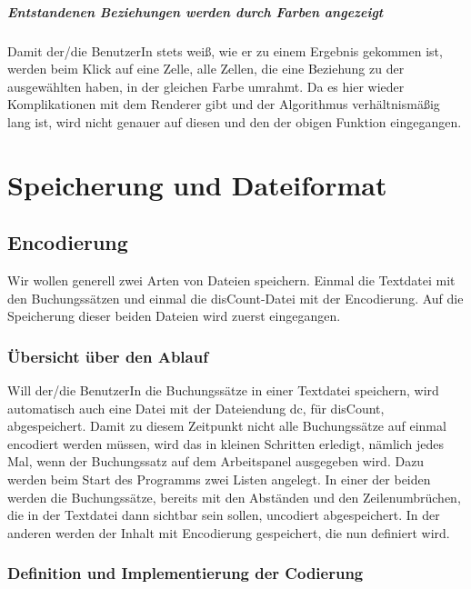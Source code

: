 \documentclass[12pt]{report}
\begin{document}
\subsubsection{Entstandenen Beziehungen werden durch Farben angezeigt}
Damit der/die BenutzerIn stets weiß, wie er zu einem Ergebnis gekommen ist, werden beim Klick auf eine Zelle, alle Zellen, die eine Beziehung zu der ausgewählten haben, in der gleichen Farbe umrahmt. Da es hier wieder Komplikationen mit dem Renderer gibt und der Algorithmus verhältnismäßig lang ist, wird nicht genauer auf diesen und den der obigen Funktion eingegangen.





\part{Speicherung und Dateiformat}

\chapter{Encodierung}
Wir wollen generell zwei Arten von Dateien speichern. Einmal die Textdatei mit den Buchungssätzen und einmal die disCount-Datei mit der Encodierung. Auf die Speicherung dieser beiden Dateien wird zuerst eingegangen.


\section{Übersicht über den Ablauf}
Will der/die BenutzerIn die Buchungssätze in einer Textdatei speichern, wird automatisch auch eine Datei mit der Dateiendung dc, für disCount, abgespeichert. Damit zu diesem Zeitpunkt nicht alle Buchungssätze auf einmal encodiert werden müssen, wird das in kleinen Schritten erledigt, nämlich jedes Mal, wenn der Buchungssatz auf dem Arbeitspanel ausgegeben wird. Dazu werden beim Start des Programms zwei Listen angelegt. In einer der beiden werden die Buchungssätze, bereits mit den Abständen und den Zeilenumbrüchen, die in der Textdatei dann sichtbar sein sollen, uncodiert abgespeichert. In der anderen werden der Inhalt mit Encodierung gespeichert, die nun definiert wird.

\section{Definition und Implementierung der Codierung}
\end{document}
